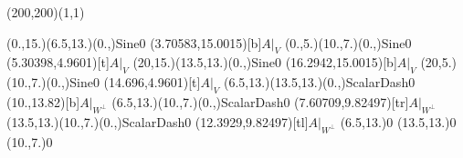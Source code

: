 \unitlength=1bp%

\begin{feynartspicture}(200,200)(1,1)

\FADiagram{}
\FAProp(0.,15.)(6.5,13.)(0.,){Sine}{0}
\FALabel(3.70583,15.0015)[b]{$A|_V$}
\FAProp(0.,5.)(10.,7.)(0.,){Sine}{0}
\FALabel(5.30398,4.9601)[t]{$A|_V$}
\FAProp(20,15.)(13.5,13.)(0.,){Sine}{0}
\FALabel(16.2942,15.0015)[b]{$A|_V$}
\FAProp(20,5.)(10.,7.)(0.,){Sine}{0}
\FALabel(14.696,4.9601)[t]{$A|_V$}
\FAProp(6.5,13.)(13.5,13.)(0.,){ScalarDash}{0}
\FALabel(10.,13.82)[b]{$A|_{W^\perp}$}
\FAProp(6.5,13.)(10.,7.)(0.,){ScalarDash}{0}
\FALabel(7.60709,9.82497)[tr]{$A|_{W^\perp}$}
\FAProp(13.5,13.)(10.,7.)(0.,){ScalarDash}{0}
\FALabel(12.3929,9.82497)[tl]{$A|_{W^\perp}$}
\FAVert(6.5,13.){0}
\FAVert(13.5,13.){0}
\FAVert(10.,7.){0}
\end{feynartspicture}

